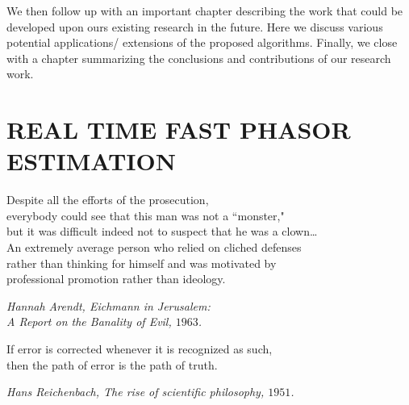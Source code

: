 \documentclass{UCF_ETD}
\begin{document}
We then follow up with an important chapter describing the work that could be developed upon ours existing research in the future. Here we discuss various potential applications/ extensions of the proposed algorithms. Finally, we close with a chapter summarizing the conclusions and contributions of our research work. 


\chapter{REAL TIME FAST PHASOR ESTIMATION} \label{Chap_PhasorEstimation}

\epigraph{Despite all the efforts of the prosecution,   \\
everybody could see that this man was not a ``monster,"  \\
but it was difficult indeed not to suspect that he was a clown… \\
An extremely average person who relied on cliched defenses  \\
rather than thinking for himself and was motivated by  \\
professional promotion rather than ideology.}{\itshape Hannah Arendt,  Eichmann in Jerusalem: \\  \hspace{45mm} A Report on the Banality of Evil, $1963$.}

\epigraph{If error is corrected whenever it is recognized as such, \\
then the path of error is the path of truth.}{\itshape Hans Reichenbach, 
				     The rise of scientific philosophy, $1951$.}
				   
\end{document}
